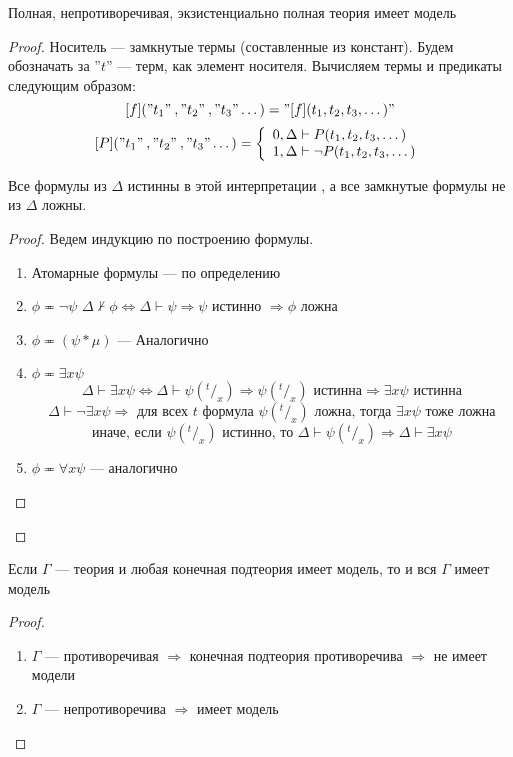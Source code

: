 \begin{lemma}
    Полная, непротиворечивая, экзистенциально полная теория имеет модель
\end{lemma}
\begin{proof}
    Носитель --- замкнутые термы (составленные из констант). Будем обозначать за ''$t$'' --- терм, как элемент носителя. Вычисляем термы и предикаты следующим образом:
    $$[f]("t_1"\:,"t_2"\:, "t_3"\dots) = "[f](t_1, t_2, t_3, \dots)"$$
    $$[P]("t_1"\:, "t_2"\:, "t_3"\dots) = \left\{\begin{array}{l}
        0, \Delta\vdash P(t_1, t_2, t_3, \dots)  \\
        1, \Delta\vdash \neg P(t_1, t_2, t_3, \dots)
    \end{array}\right.$$
    \begin{proposition}
        Все формулы из $\Delta$ истинны в этой интерпретации , а все замкнутые формулы не из $\Delta$ ложны.
    \end{proposition}
    \begin{proof}
        Ведем индукцию по построению формулы.
        \begin{enumerate}
            \item Атомарные формулы --- по определению
            \item $\phi \eqcirc \neg \psi$
            $\Delta\not\vdash\phi \Leftrightarrow \Delta\vdash\psi \Rightarrow \psi \text{ истинно } \Rightarrow \phi \text{ ложна }$
            \item $\phi \eqcirc (\psi * \mu)$ --- Аналогично
            \item $\phi \eqcirc \exists x \psi$
            $$\Delta \vdash \exists x \psi \Leftrightarrow \Delta \vdash \psi(^t/_x) \Rightarrow \psi(^t/_x) \text{ истинна} \Rightarrow \exists x \psi \text{ истинна}$$
            $$\Delta \vdash \neg \exists x \psi \Rightarrow \text{ для всех $t$ формула $\psi(^t/_x)$ ложна, тогда $\exists x \psi$ тоже ложна}$$
            $$\text{иначе, если $\psi(^t/_x)$ истинно, то $\Delta\vdash\psi(^t/_x) \Rightarrow \Delta \vdash \exists x \psi$}$$
            \item $\phi \eqcirc \forall x \psi$ --- аналогично
        \end{enumerate}
    \end{proof}
\end{proof}

\begin{theorem}
    Если $\Gamma$ --- теория и любая конечная подтеория имеет модель, то и вся $\Gamma$ имеет модель
\end{theorem}
\begin{proof}\indent
    \begin{enumerate}
        \item $\Gamma$ --- противоречивая $\Rightarrow$ конечная подтеория противоречива $\Rightarrow$ не имеет модели
        \item $\Gamma$ --- непротиворечива $\Rightarrow$ имеет модель
    \end{enumerate}
\end{proof}